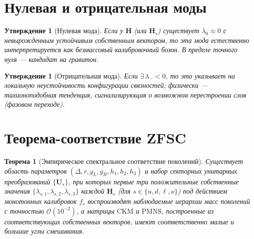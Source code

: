 \documentclass[12pt,a4paper]{article}
\theoremstyle{definition}
\theoremstyle{plain}
\newtheorem{theorem}[definition]{Теорема}
\newtheorem{proposition}[definition]{Утверждение}
\theoremstyle{remark}
\newcommand{\Hbase}{\mathbf{H}}
\newcommand{\Hs}{\mathbf{H}_{s}}
\newcommand{\U}{\mathbf{U}}
\begin{document}
\section{Нулевая и отрицательная моды}
\begin{proposition}[Нулевая мода]
Если у \(\Hbase\) (или \(\Hs\)) существует \(\lambda_0\approx 0\) с невырожденным устойчивым собственным вектором, то эта мода естественно интерпретируется как безмассовый калибровочный бозон. В пределе точного нуля --- кандидат на гравитон.
\end{proposition}

\begin{proposition}[Отрицательная мода]
Если \(\exists\,\lambda_{-}<0\), то это указывает на локальную неустойчивость конфигурации связностей; физически --- тахионоподобная тенденция, сигнализирующая о возможном перестроении слоя (фазовом переходе).
\end{proposition}

\section{Теорема-соответствие ZFSC}
\begin{theorem}[Эмпирическое спектральное соответствие поколений]\label{thm:correspondence}
Существует область параметров \((\Delta,r,g_L,g_R,h_1,h_2,h_3)\) и набор секторных унитарных преобразований \(\{\U_s\}\), при которых первые три положительные собственные значения \(\{\lambda_{s,1},\lambda_{s,2},\lambda_{s,3}\}\) каждой \(\Hs\) (для \(s\in\{u,d,\ell,\nu\}\)) под действием монотонных калибровок \(f_s\) воспроизводят наблюдаемые иерархии масс поколений с точностью \(\mathcal{O}(10^{-2})\), а матрицы \(\mathrm{CKM}\) и \(\mathrm{PMNS}\), построенные из соответствующих собственных векторов, имеют соответственно малые и большие углы смешивания.
\end{theorem}
\end{document}
